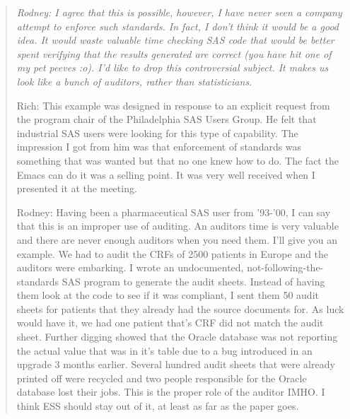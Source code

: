 \documentclass{article}
\newenvironment{Comment}{\begin{quote}\small\itshape }{\end{quote}}
\begin{document}
\begin{Comment} Rodney: I agree that this is possible, however, I 
 have never seen a company attempt to enforce such standards.  In fact,
 I don't think it would be a good idea.  It would waste valuable time 
 checking SAS code that would be better spent verifying that the results 
 generated are correct (you have hit one of my pet peeves :o).
 I'd like to drop this controversial subject.  It makes us look like
 a bunch of auditors, rather than statisticians.

Rich: This example was designed in response to an explicit request
from the program chair of the Philadelphia SAS Users Group.  He felt
that industrial SAS users were looking for this type of capability.
The impression I got from him was that enforcement of standards was
something that was wanted but that no one knew how to do.  The fact
the Emacs can do it was a selling point.  It was very well received
when I presented it at the meeting.

Rodney: Having been a pharmaceutical SAS user from '93-'00, I can say
that this is an improper use of auditing.  An auditors time is very 
valuable and there are never enough auditors when you need them.  
I'll give you an example.  We had to audit the CRFs of 2500 patients 
in Europe and the auditors were embarking.  I wrote an undocumented, 
not-following-the-standards SAS program to generate the audit sheets.  
Instead of having them look at the code to see if it was compliant, 
I sent them 50 audit sheets for patients that they already had the 
source documents for.  As luck would have it, we had one patient that's 
CRF did not match the audit sheet.  Further digging showed that the 
Oracle database was not reporting the actual value that was in
it's table due to a bug introduced in an upgrade 3 months earlier.
Several hundred audit sheets that were already printed off were
recycled and two people responsible for the Oracle database lost 
their jobs.  This is the proper role of the auditor IMHO.  I think
ESS should stay out of it, at least as far as the paper goes.
\end{Comment}
\end{document}
